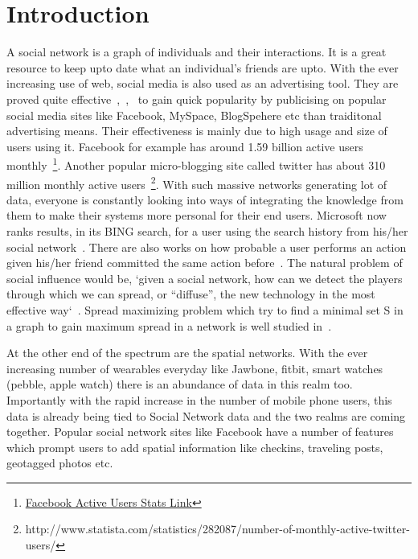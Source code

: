 \section{Introduction}
A social network is a graph of individuals and their interactions. It is a great resource to keep upto date what an individual's friends are upto. With the ever increasing use of web, social media is also used as an advertising tool. They are proved quite effective~\cite{F1969},~\cite{JP1987},~\cite{PM2001} to gain quick popularity by publicising on popular social media sites like Facebook, MySpace, BlogSpehere etc than traiditonal advertising means. Their effectiveness is mainly due to high usage and size of users using it. Facebook for example has around 1.59 billion active users monthly~\footnote{\href{http://www.statista.com/statistics/264810/number-of-monthly-active-facebook-users-worldwide/}{Facebook Active Users Stats Link}}. Another popular micro-blogging site called twitter has about 310 million monthly active users~\footnote{http://www.statista.com/statistics/282087/number-of-monthly-active-twitter-users/}. With such massive networks generating lot of data, everyone is constantly looking into ways of integrating the knowledge from them to make their systems more personal for their end users. Microsoft now ranks results, in its BING search, for a user using the search history from his/her social network~\cite{M2011}. There are also works on how probable a user performs an action given his/her friend committed the same action before~\cite{DJE2003}. The natural problem of social influence would be, `given a social network, how can we detect the players through which we can spread, or “diffuse”, the new technology in the most effective way`~\cite{EA2007}. Spread maximizing problem which try to find a minimal set S in a graph to gain maximum spread in a network is well studied in~\cite{MP2002}.

At the other end of the spectrum are the spatial networks. With the ever increasing number of wearables everyday like Jawbone, fitbit, smart watches (pebble, apple watch) there is an abundance of data in this realm too. Importantly with the rapid increase in the number of mobile phone users, this data is already being tied to Social Network data and the two realms are coming together. Popular social network sites like Facebook have a number of features which prompt users to add spatial information like checkins, traveling posts, geotagged photos etc.

